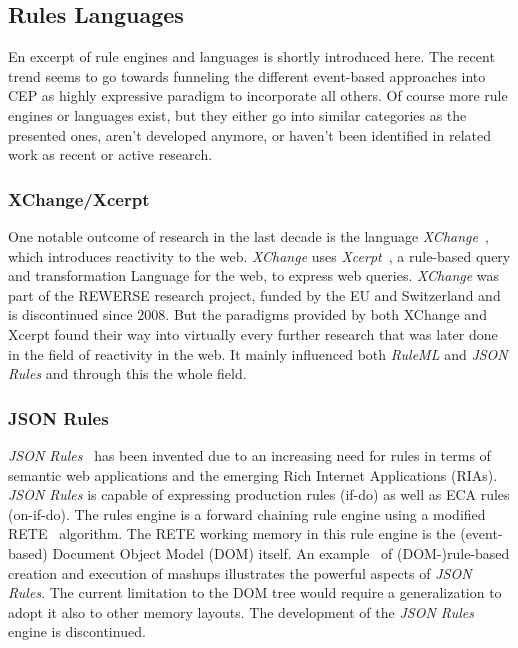\documentclass[11pt]{article}%
\begin{document}
\subsection{Rules Languages}
En excerpt of rule engines and languages is shortly introduced here. The recent trend seems to go towards funneling the different event-based approaches into CEP as highly expressive paradigm to incorporate all others. Of course more rule engines or languages exist, but they either go into similar categories as the presented ones, aren't developed anymore, or haven't been identified in related work as recent or active research.

\subsubsection{XChange/Xcerpt}
One notable outcome of research in the last decade is the language \emph{XChange}~\cite{2005-Patranjan-TLE.pdf,2005-Bry_etal-XChange.pdf}, which introduces reactivity to the web. \emph{XChange} uses \emph{Xcerpt}~\cite{2004-Schaffert-Xcerpt.pdf}, a rule-based query and transformation Language for the web, to express web queries.
\emph{XChange} was part of the REWERSE research project, funded by the EU and Switzerland and is discontinued since 2008. But the paradigms provided by both XChange and Xcerpt found their way into virtually every further research that was later done in the field of reactivity in the web. It mainly influenced both \emph{RuleML} and \emph{JSON Rules} and through this the whole field. 

\subsubsection{JSON Rules}
\emph{JSON Rules}~\cite{2008-Giurca_Pascalau-JSON_Rules.pdf} has been invented due to an increasing need for rules in terms of semantic web applications and the emerging Rich Internet Applications (RIAs). \emph{JSON Rules} is capable of expressing production rules (if-do) as well as ECA rules (on-if-do). The rules engine is a forward chaining rule engine using a modified RETE~\cite{1982-Crockford-RETE.pdf} algorithm. The RETE working memory in this rule engine is the (event-based) Document Object Model (DOM) itself. An example~\cite{2009-Pascalau_Giurca-RBACEM.pdf} of (DOM-)rule-based creation and execution of mashups illustrates the powerful aspects of \emph{JSON Rules}. The current limitation to the DOM tree would require a generalization to adopt it also to other memory layouts. The development of the \emph{JSON Rules} engine is discontinued.
\end{document}
